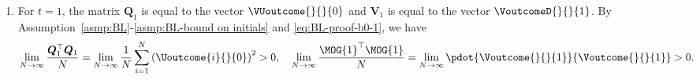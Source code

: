\begin{enumerate}[label=(\alph*)]
    \item For $t=1$, the matrix $\bm{Q}_1$ is equal to the vector $\VUoutcome{}{}{0}$ and $\bm{V}_1$ is equal to the vector $\VoutcomeD{}{}{1}$. By Assumption~\ref{asmp:BL}-\ref{asmp:BL-bound on initials} and \eqref{eq:BL-proof-b0-1}, we have
    \begin{align*}
        \lim_{N \rightarrow \infty} \frac{\bm{Q}_1^\top \bm{Q}_1}{N}
        =
        \lim_{N \rightarrow \infty}
        \frac{1}{N}
        \sum_{i=1}^N \left(\Uoutcome{i}{}{0}\right)^2 > 0,
        \quad
        \lim_{N \rightarrow \infty} \frac{\MOG{1}^\top \MOG{1}}{N} 
        =
        \lim_{N \rightarrow \infty} \pdot{\Voutcome{}{}{1}}{\Voutcome{}{}{1}}
        > 0.
    \end{align*}
    \end{enumerate}


